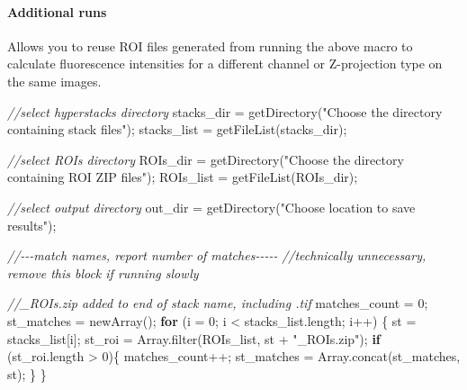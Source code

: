 \documentclass[
  12pt,
  a4paper,
]{book}
\newenvironment{Shaded}{}{}
\newcommand{\CommentTok}[1]{\textcolor[rgb]{0.38,0.63,0.69}{\textit{#1}}}
\newcommand{\ControlFlowTok}[1]{\textcolor[rgb]{0.00,0.44,0.13}{\textbf{#1}}}
\newcommand{\DecValTok}[1]{\textcolor[rgb]{0.25,0.63,0.44}{#1}}
\newcommand{\NormalTok}[1]{#1}
\newcommand{\OperatorTok}[1]{\textcolor[rgb]{0.40,0.40,0.40}{#1}}
\newcommand{\StringTok}[1]{\textcolor[rgb]{0.25,0.44,0.63}{#1}}
\begin{document}
\paragraph{Additional runs}\label{additional-runs}

Allows you to reuse ROI files generated from running the above macro to calculate fluorescence intensities for a different channel or Z-projection type on the same images.

\begin{Shaded}
\begin{Highlighting}[]
\CommentTok{//select hyperstacks directory}
\NormalTok{stacks\_dir }\OperatorTok{=}\NormalTok{ getDirectory}\OperatorTok{(}\StringTok{"Choose the directory containing stack files"}\OperatorTok{);}
\NormalTok{stacks\_list }\OperatorTok{=}\NormalTok{  getFileList}\OperatorTok{(}\NormalTok{stacks\_dir}\OperatorTok{);}

\CommentTok{//select ROIs directory}
\NormalTok{ROIs\_dir }\OperatorTok{=}\NormalTok{ getDirectory}\OperatorTok{(}\StringTok{"Choose the directory containing ROI ZIP files"}\OperatorTok{);}
\NormalTok{ROIs\_list }\OperatorTok{=}\NormalTok{ getFileList}\OperatorTok{(}\NormalTok{ROIs\_dir}\OperatorTok{);}

\CommentTok{//select output directory}
\NormalTok{out\_dir }\OperatorTok{=}\NormalTok{ getDirectory}\OperatorTok{(}\StringTok{"Choose location to save results"}\OperatorTok{);}

\CommentTok{//{-}{-}{-}match names, report number of matches{-}{-}{-}{-}{-}}
\CommentTok{//technically unnecessary, remove this block if running slowly}

\CommentTok{//\_ROIs.zip added to end of stack name, including .tif}
\NormalTok{matches\_count }\OperatorTok{=} \DecValTok{0}\OperatorTok{;}
\NormalTok{st\_matches }\OperatorTok{=}\NormalTok{ newArray}\OperatorTok{();}
\ControlFlowTok{for} \OperatorTok{(}\NormalTok{i }\OperatorTok{=} \DecValTok{0}\OperatorTok{;}\NormalTok{ i }\OperatorTok{\textless{}}\NormalTok{ stacks\_list}\OperatorTok{.}\NormalTok{length}\OperatorTok{;}\NormalTok{ i}\OperatorTok{++)} \OperatorTok{\{}
\NormalTok{    st }\OperatorTok{=}\NormalTok{ stacks\_list}\OperatorTok{[}\NormalTok{i}\OperatorTok{];}
\NormalTok{    st\_roi }\OperatorTok{=}\NormalTok{ Array}\OperatorTok{.}\NormalTok{filter}\OperatorTok{(}\NormalTok{ROIs\_list}\OperatorTok{,}\NormalTok{ st }\OperatorTok{+} \StringTok{"\_ROIs.zip"}\OperatorTok{);}
    \ControlFlowTok{if} \OperatorTok{(}\NormalTok{st\_roi}\OperatorTok{.}\NormalTok{length }\OperatorTok{\textgreater{}} \DecValTok{0}\OperatorTok{)\{}
\NormalTok{        matches\_count}\OperatorTok{++;}
\NormalTok{        st\_matches }\OperatorTok{=}\NormalTok{ Array}\OperatorTok{.}\NormalTok{concat}\OperatorTok{(}\NormalTok{st\_matches}\OperatorTok{,}\NormalTok{ st}\OperatorTok{);}
    \OperatorTok{\}}
\OperatorTok{\}}


\end{Highlighting}
\end{Shaded}
\end{document}
